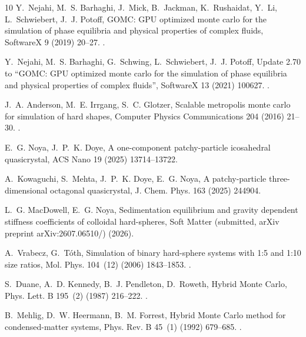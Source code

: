 \documentclass[final,5p,times,twocolumn]{elsarticle}
\begin{document}
\begin{thebibliography}{10}
Y.~Nejahi, M.~S. Barhaghi, J.~Mick, B.~Jackman, K.~Rushaidat, Y.~Li,
  L.~Schwiebert, J.~J. Potoff, {GOMC}: {GPU} optimized monte carlo for the
  simulation of phase equilibria and physical properties of complex fluids,
  SoftwareX 9 (2019) 20--27.
\newblock \href {https://doi.org/10.1016/j.softx.2018.11.005}
  {}.

Y.~Nejahi, M.~S. Barhaghi, G.~Schwing, L.~Schwiebert, J.~J. Potoff, Update 2.70
  to ``{GOMC}: {GPU} optimized monte carlo for the simulation of phase
  equilibria and physical properties of complex fluids'', SoftwareX 13 (2021)
  100627.
\newblock \href {https://doi.org/10.1016/j.softx.2020.100627}
  {}.

J.~A. Anderson, M.~E. Irrgang, S.~C. Glotzer, Scalable metropolis monte carlo
  for simulation of hard shapes, Computer Physics Communications 204 (2016)
  21--30.
\newblock \href {https://doi.org/10.1016/j.cpc.2016.02.024}
  {}.

E.~G. Noya, J.~P.~K. Doye, A one-component patchy-particle icosahedral
  quasicrystal, ACS Nano 19 (2025) 13714--13722.

A.~Kowaguchi, S.~Mehta, J.~P.~K. Doye, E.~G. Noya, A patchy-particle
  three-dimensional octagonal quasicrystal, J. Chem. Phys. 163 (2025) 244904.

L.~G. MacDowell, E.~G. Noya, Sedimentation equilibrium and gravity dependent
  stiffness coefficients of colloidal hard-spheres, Soft Matter (submitted,
  arXiv preprint arXiv:2607.06510/) (2026).

A.~Vrabecz, G.~T{\'o}th, Simulation of binary hard-sphere systems with 1:5 and
  1:10 size ratios, Mol. Phys. 104~(12) (2006) 1843--1853.
\newblock \href {https://doi.org/10.1080/00268970600602313}
  {}.

S.~Duane, A.~D. Kennedy, B.~J. Pendleton, D.~Roweth, Hybrid {Monte Carlo},
  Phys. Lett. B 195~(2) (1987) 216--222.
\newblock \href {https://doi.org/10.1016/0370-2693(87)91197-X}
  {}.

B.~Mehlig, D.~W. Heermann, B.~M. Forrest, Hybrid {Monte Carlo} method for
  condensed-matter systems, Phys. Rev. B 45~(1) (1992) 679--685.
\newblock \href {https://doi.org/10.1103/PhysRevB.45.679}
  {}.


\end{thebibliography}
\end{document}
